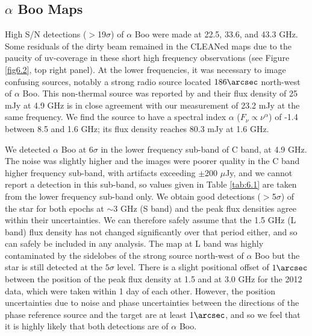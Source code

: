 \subsection{$\alpha$ Boo Maps}\label{sec:6.2.1}
High S/N detections ($>$19$\sigma$) of $\alpha$ Boo were made at 22.5, 33.6, and 43.3 GHz. Some residuals of the dirty beam remained in the CLEANed maps due to the paucity of uv-coverage in these short high frequency observations (see Figure \ref{fig6.2}, top right panel). At the lower frequencies, it was necessary to image confusing sources, notably a strong radio source located $186\arcsec$ north-west of $\alpha$ Boo. This non-thermal source was reported by \cite{drake_1983} and their flux density of 25 mJy at 4.9 GHz is in close agreement with our measurement of 23.2 mJy at the same frequency. We find the source to have a spectral index $\alpha$ ($F_{\nu} \propto \nu ^{\alpha}$) of -1.4 between 8.5 and 1.6 GHz; its flux density reaches 80.3 mJy at 1.6 GHz.

We detected $\alpha$ Boo at 6$\sigma$ in the lower frequency sub-band of C band, at 4.9 GHz. The noise was slightly higher and the images were poorer quality in the C band higher frequency sub-band, with artifacts exceeding $\pm$200 $\mu$Jy, and we cannot report a detection in this sub-band, so values given in Table \ref{tab:6.1} are taken from the lower frequency sub-band only. We obtain good detections ($>$5$\sigma$) of the star for both epochs at $\sim 3$ GHz (S band) and the peak flux densities agree within their uncertainties. We can therefore safely assume that the 1.5 GHz (L band) flux density has not changed significantly over that period either, and so can safely be included in any analysis. The map at L band was highly contaminated by the sidelobes of the strong source north-west of $\alpha$ Boo but the star is still detected at the $5\sigma$ level. There is a slight positional offset of $1\arcsec$ between the position of the peak flux density at 1.5 and at 3.0 GHz for the 2012 data, which were taken within 1 day of each other. However, the position uncertainties due to noise and phase uncertainties between the directions of the phase reference source and the target are at least $1\arcsec$, and so we feel that it is highly likely that both detections are of $\alpha$ Boo.

